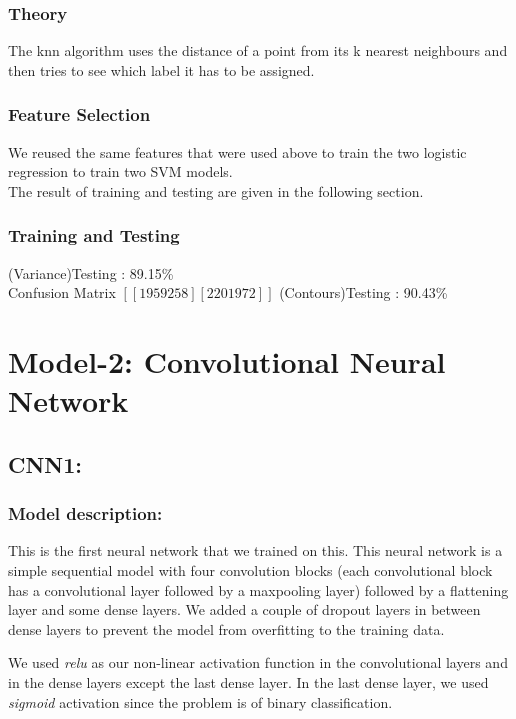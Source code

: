 \documentclass{scrreprt}
\begin{document}
\subsubsection{Theory}
The knn algorithm uses the distance of a point from its k nearest neighbours and then tries to see which label it has to be assigned.


\subsubsection{Feature Selection}
We reused the same features that were used above to train the two logistic regression to train two SVM models.\\
The result of training and testing are given in the following section.

\subsubsection{Training and Testing}
(Variance)Testing : 89.15\%    \\
	Confusion Matrix
	$	[[1959  258]
 		[ 220 1972]] $
(Contours)Testing : 90.43\%



\section{Model-2: Convolutional Neural Network}

\subsection{CNN1:}

\subsubsection{Model description:}
This is the first neural network that we trained on this. This neural network is a simple sequential model with four convolution blocks (each convolutional block has a convolutional layer followed by a maxpooling layer) followed by a flattening layer and some dense layers. We added a couple of dropout layers in between dense layers to prevent the model from overfitting to the training data.

We used \textit{relu} as our non-linear activation function in the convolutional layers and in the dense layers except the last dense layer. In the last dense layer, we used \textit{sigmoid} activation since the problem is of binary classification.
\end{document}
